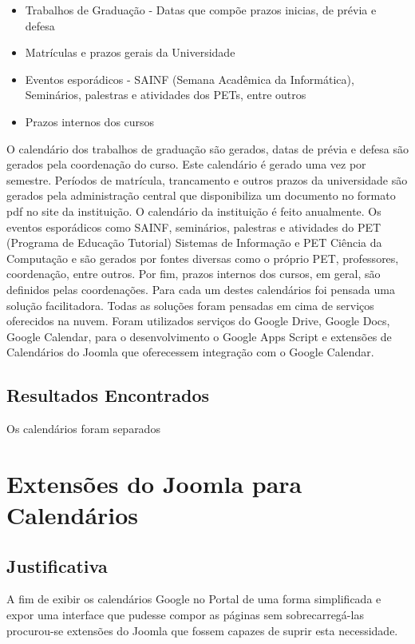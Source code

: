 \begin{itemize}
   \item Trabalhos de Graduação - Datas que compõe prazos inicias, de prévia e defesa
   \item Matrículas e prazos gerais da Universidade
   \item Eventos esporádicos - SAINF (Semana Acadêmica da Informática), Seminários, palestras e atividades dos PETs, entre outros
   \item Prazos internos dos cursos
\end{itemize}

O calendário dos trabalhos de graduação são gerados, datas de prévia e defesa são gerados pela coordenação do curso. Este calendário é gerado uma vez por semestre. Períodos de matrícula, trancamento e outros prazos da universidade são gerados pela administração central que disponibiliza um documento no formato pdf no site da instituição. O calendário da instituição é feito anualmente. Os eventos esporádicos como SAINF, seminários, palestras e atividades do PET (Programa de Educação Tutorial) Sistemas de Informação e PET Ciência da Computação e são gerados por fontes diversas como o próprio PET, professores, coordenação, entre outros. Por fim, prazos internos dos cursos, em geral, são definidos pelas coordenações. Para cada um destes calendários foi pensada uma solução facilitadora. Todas as soluções foram pensadas em cima de serviços oferecidos na nuvem. Foram utilizados serviços do Google Drive, Google Docs, Google Calendar, para o desenvolvimento o Google Apps Script e extensões de Calendários do Joomla que oferecessem integração com o Google Calendar.

\subsection{Resultados Encontrados}
Os calendários foram separados


\section{Extensões do Joomla para Calendários}
\subsection{Justificativa}
A fim de exibir os calendários Google no Portal de uma forma simplificada e expor uma interface que pudesse compor as páginas sem sobrecarregá-las procurou-se extensões do Joomla que fossem capazes de suprir esta necessidade. 

